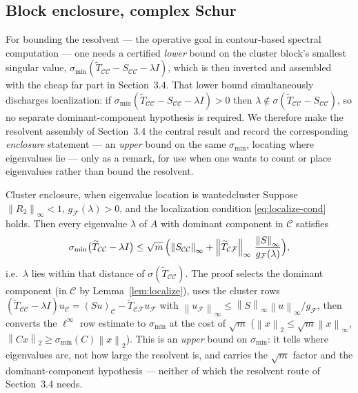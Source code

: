 \documentclass[11pt, a4paper]{article}
\numberwithin{equation}{section}
\newcommand{\norm}[1]{\left\|#1\right\|}
\newcommand{\tT}{\widetilde{T}}
\begin{document}
\subsection{Block enclosure, complex Schur}

For bounding the resolvent --- the operative goal in contour-based spectral
computation --- one needs a certified \emph{lower} bound on the cluster block's
smallest singular value, $\sigma_{\min}(\tT_{\mathcal{C}\mathcal{C}} -
S_{\mathcal{C}\mathcal{C}} - \lambda I)$, which is then inverted and assembled
with the cheap far part in Section~3.4.  That lower bound simultaneously
discharges localization: if $\sigma_{\min}(\tT_{\mathcal{C}\mathcal{C}} -
S_{\mathcal{C}\mathcal{C}} - \lambda I) > 0$ then $\lambda \notin
\sigma(\tT_{\mathcal{C}\mathcal{C}} - S_{\mathcal{C}\mathcal{C}})$, so no separate
dominant-component hypothesis is required.  We therefore make the resolvent
assembly of Section~3.4 the central result and record the corresponding
\emph{enclosure} statement --- an \emph{upper} bound on the same
$\sigma_{\min}$, locating where eigenvalues lie --- only as a remark, for use
when one wants to count or place eigenvalues rather than bound the resolvent.

\begin{remark}{Cluster enclosure, when eigenvalue location is wanted}{cluster}
  Suppose $\norm{R_2}_\infty < 1$, $g_{\mathcal{F}}(\lambda) > 0$, and the
  localization condition \eqref{eq:localize-cond} holds.  Then every eigenvalue
  $\lambda$ of $A$ with dominant component in $\mathcal{C}$ satisfies
  \[
    \sigma_{\min}\bigl(\tT_{\mathcal{C}\mathcal{C}} - \lambda I\bigr)
      \le \sqrt{m}\,\Bigl(\norm{S_{\mathcal{C}\mathcal{C}}}_\infty
        + \norm{\tT_{\mathcal{C}\mathcal{F}}}_\infty\,
          \frac{\norm{S}_\infty}{g_{\mathcal{F}}(\lambda)}\Bigr),
  \]
  i.e.\ $\lambda$ lies within that distance of $\sigma(\tT_{\mathcal{C}
  \mathcal{C}})$.  The proof selects the dominant component (in $\mathcal{C}$ by
  Lemma~\ref{lem:localize}), uses the cluster rows $(\tT_{\mathcal{C}\mathcal{C}}
  - \lambda I)u_{\mathcal{C}} = (Su)_{\mathcal{C}} - \tT_{\mathcal{C}\mathcal{F}}
  u_{\mathcal{F}}$ with $\norm{u_{\mathcal{F}}}_\infty \le \norm{S}_\infty
  \norm{u}_\infty / g_{\mathcal{F}}$, then converts the $\ell^\infty$ row
  estimate to $\sigma_{\min}$ at the cost of $\sqrt m$ ($\norm{x}_2 \le \sqrt m
  \norm{x}_\infty$, $\norm{Cx}_2 \ge \sigma_{\min}(C)\norm{x}_2$).  This is an
  \emph{upper} bound on $\sigma_{\min}$: it tells where eigenvalues are, not how
  large the resolvent is, and carries the $\sqrt m$ factor and the
  dominant-component hypothesis --- neither of which the resolvent route of
  Section~3.4 needs.
\end{remark}
\end{document}
